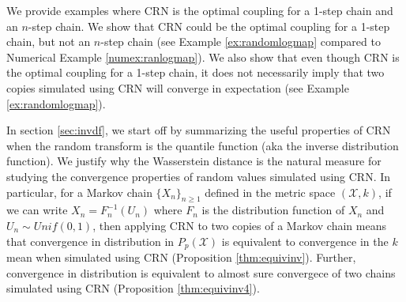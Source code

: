 \documentclass[12pt]{article}
\theoremstyle{plain}%
\theoremstyle{definition}
\begin{document}



We provide examples where CRN is the optimal coupling for a 1-step chain and an $n$-step chain. We show that CRN could be the optimal coupling for a 1-step chain, but not an $n$-step chain (see Example \ref{ex:randomlogmap} compared to Numerical Example \ref{numex:ranlogmap}). We also show that even though CRN is the optimal coupling for a 1-step chain, it does not necessarily imply that two copies simulated using CRN will converge in expectation (see Example \ref{ex:randomlogmap}). 


In section \ref{sec:invdf}, we start off by summarizing the useful properties of CRN when the random transform is the quantile function (aka the inverse distribution function). We justify why the Wasserstein distance is the natural measure for studying the convergence properties of random values simulated using CRN. In particular, for a Markov chain $\{X_n\}_{n\geq 1}$ defined in the metric space $(\mathcal{X},k)$, if we can write $X_n=F^{-1}_n(U_n)$ where $F_n$ is the distribution function of $X_n$ and $U_n\sim Unif(0,1)$, then applying CRN to two copies of a Markov chain means that convergence in distribution in $P_p(\mathcal{X})$ is equivalent to convergence in the $k$ mean when simulated using CRN (Proposition  \ref{thm:equivinv}). Further, convergence in distribution is equivalent to almost sure convergece of two chains simulated using CRN (Proposition \ref{thm:equivinv4}). 
\end{document}
